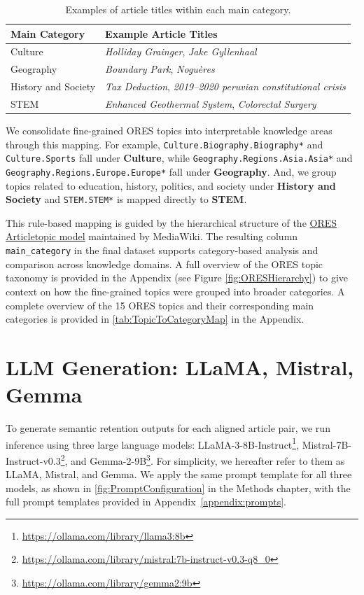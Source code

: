 \documentclass{DESSThesis}
\begin{document}
\begin{table}[H]
\centering
\caption{Examples of article titles within each main category.}
\label{tab:main_category_examples}
\renewcommand{\arraystretch}{1.2}
\setlength{\tabcolsep}{12pt}
\begin{tabular}{l l}
\toprule
\textbf{Main Category} & \textbf{Example Article Titles} \\
\midrule
Culture & \textit{Holliday Grainger}, \textit{Jake Gyllenhaal} \\
Geography & \textit{Boundary Park}, \textit{Noguères} \\
History and Society & \textit{Tax Deduction}, \textit{2019–2020 peruvian constitutional crisis} \\
STEM & \textit{Enhanced Geothermal System}, \textit{Colorectal Surgery} \\
\bottomrule
\end{tabular}
\end{table}

We consolidate fine-grained ORES topics into interpretable knowledge areas through this mapping. For example, \texttt{Culture.Biography.Biography*} and \texttt{Culture.Sports} fall under \textbf{Culture}, while \texttt{Geography.Regions.Asia.Asia*} and \texttt{Geography.Regions.Europe.Europe*} fall under \textbf{Geography}. And, we group topics related to education, history, politics, and society under \textbf{History and Society} and \texttt{STEM.STEM*} is mapped directly to \textbf{STEM}. 

This rule-based mapping is guided by the hierarchical structure of the \href{https://www.mediawiki.org/wiki/ORES/Articletopic}{\color{blue} ORES Articletopic model} maintained by MediaWiki. The resulting column \texttt{main\_category} in the final dataset supports category-based analysis and comparison across knowledge domains. A full overview of the ORES topic taxonomy is provided in the Appendix (see Figure \ref{fig:ORESHierarchy}) to give context on how the fine-grained topics were grouped into broader categories. A complete overview of the 15 ORES topics and their corresponding main categories is provided in \autoref{tab:TopicToCategoryMap} in the Appendix.

\section{LLM Generation: LLaMA, Mistral, Gemma}

To generate semantic retention outputs for each aligned article pair, we run inference using three large language models: LLaMA-3-8B-Instruct\footnote{\url{https://ollama.com/library/llama3:8b}}, Mistral-7B-Instruct-v0.3\footnote{\url{https://ollama.com/library/mistral:7b-instruct-v0.3-q8_0}}, and Gemma-2-9B\footnote{\url{https://ollama.com/library/gemma2:9b}}. For simplicity, we hereafter refer to them as LLaMA, Mistral, and Gemma. We apply the same prompt template for all three models, as shown in \autoref{fig:PromptConfiguration} in the Methods chapter, with the full prompt templates provided in Appendix~\ref{appendix:prompts}.
\end{document}
